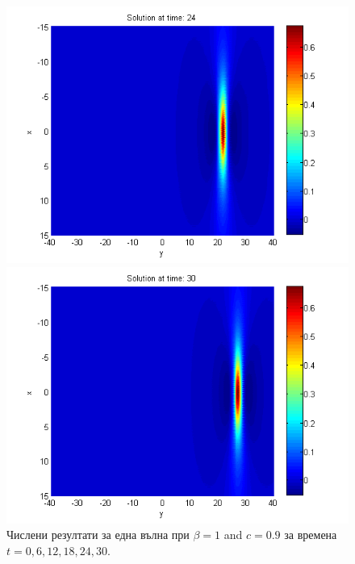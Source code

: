 \documentclass{article}
\begin{document}
\begin{figure}[ht]
\begin{minipage}[b]{0.30\linewidth}
		 \includegraphics[width=\linewidth]{../amitans/figures/solution_128x90_bt1_c090_T24.png}
	\end{minipage}
	\begin{minipage}[b]{0.30\linewidth}
		 \includegraphics[width=\linewidth]{../amitans/figures/solution_128x90_bt1_c090_T30.png}
	\end{minipage}
\caption{Числени резултати за една вълна при $\beta=1$ and $c = 0.9$ за времена $t=0,6,12,18,24,30$.}
\label{Wave2}
\end{figure}
\end{document}
